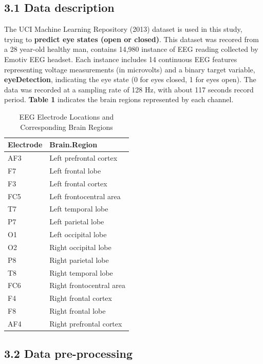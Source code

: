 \documentclass[
  doc]{apa6}
\begin{document}
\subsection{3.1 Data description}\label{data-description}

The UCI Machine Learning Repository (2013) dataset is used in this study, trying to \textbf{predict eye states (open or closed)}. This dataset was recored from a 28 year-old healthy man, contains 14,980 instance of EEG reading collected by Emotiv EEG headset. Each instance includes 14 continuous EEG features representing voltage measurements (in microvolts) and a binary target variable, \textbf{eyeDetection}, indicating the eye state (0 for eyes closed, 1 for eyes open). The data was recorded at a sampling rate of 128 Hz, with about 117 seconds record period. \textbf{Table 1} indicates the brain regions represented by each channel.

\begin{table}[!h]
\centering
\caption{\label{tab:electrode-table}EEG Electrode Locations and Corresponding Brain Regions}
\centering
\begin{tabular}[t]{l|l}
\hline
Electrode & Brain.Region\\
\hline
AF3 & Left prefrontal cortex\\
\hline
F7 & Left frontal lobe\\
\hline
F3 & Left frontal cortex\\
\hline
FC5 & Left frontocentral area\\
\hline
T7 & Left temporal lobe\\
\hline
P7 & Left parietal lobe\\
\hline
O1 & Left occipital lobe\\
\hline
O2 & Right occipital lobe\\
\hline
P8 & Right parietal lobe\\
\hline
T8 & Right temporal lobe\\
\hline
FC6 & Right frontocentral area\\
\hline
F4 & Right frontal cortex\\
\hline
F8 & Right frontal lobe\\
\hline
AF4 & Right prefrontal cortex\\
\hline
\end{tabular}
\end{table}

\newpage

\subsection{3.2 Data pre-processing}\label{data-pre-processing}
\end{document}
